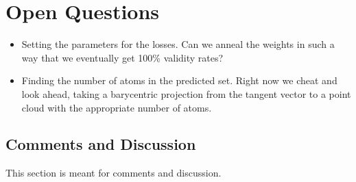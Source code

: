 \documentclass{article}
\begin{document}
\section{Open Questions}
\begin{itemize}
    \item Setting the parameters for the losses. Can we anneal the weights in such a way that we eventually get 100\% validity rates?
    \item Finding the number of atoms in the predicted set. Right now we cheat and look ahead, taking a barycentric projection from the tangent vector to a point cloud with the appropriate number of atoms.
\end{itemize}

\subsection{Comments and Discussion}

This section is meant for comments and discussion.



\end{document}
